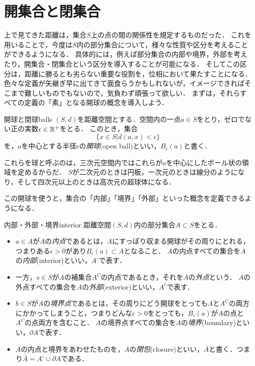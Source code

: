 \documentclass[11pt,a4paper, dvipdfmx]{jsarticle}
\begin{document}
\section{開集合と閉集合}
上で見てきた距離は，集合$S$上の点の間の関係性を規定するものだった．
これを用いることで，今度は$S$内の部分集合について，様々な性質や区分を考えることができるようになる．
具体的には，例えば部分集合の内部や境界，外部を考えたり，開集合・閉集合という区分を導入することが可能になる．
そしてこの区分は，距離に勝るとも劣らない重要な役割を，位相において果たすことになる．
色々な定義が矢継ぎ早に出てきて面食らうかもしれないが，イメージできればそこまで難しいものでもないので，気負わず頑張って欲しい．
まずは，それらすべての定義の「素」となる開球の概念を導入しよう．

\begin{dfn}{開球と閉球}{balls}
 $(S, d)$を距離空間とする．空間内の一点$a \in S$をとり，ゼロでない正の実数$\epsilon \in \mathbb{R}^+$をとる．
このとき，集合
\[
  \{ x \in S | d(a, x) < \epsilon \}
\]
を，$a$を中心とする半径$\epsilon$の\emph{開球}(open ball)といい，$B_\epsilon(a)$と書く．%
\end{dfn}
これらを球と呼ぶのは，三次元空間内ではこれらが$a$を中心にしたボール状の領域を定めるからだ．
$S$が二次元のときは円板，一次元のときは線分のようになり，そして四次元以上のときは高次元の超球体になる．

この開球を使うと，集合の「内部」「境界」「外部」といった概念を定義できるようになる．
\begin{dfn}{内部・外部・境界}{interior}
  距離空間$(S, d)$内の部分集合$A \subset S$をとる．
  \begin{itemize}
    \item $a \in A$が$A$の\emph{内点}であるとは，$A$にすっぽり収まる開球がその周りにとれる，つまりある$\epsilon > 0$があり$B_\epsilon(a) \subset A$となること．
    $A$の内点すべての集合を$A$の\emph{内部}(interior)といい，$A^\circ$で表す．
    \item 一方，$s \in S$が$A$の補集合$A^C$の内点であるとき，それを$A$の\emph{外点}という．
    $A$の外点すべての集合を$A$の\emph{外部}(exterior)といい，$A^e$で表す．
    \item $b \in S$が$A$の\emph{境界点}であるとは，その周りにどう開球をとっても$A$と$A^C$の両方にかかってしまうこと，つまりどんな$\epsilon > 0$をとっても，$B_\epsilon(a)$が$A$の点と$A^C$の点両方を含むこと．
    $A$の境界点すべての集合を$A$の\emph{境界}(boundary)といい，$\partial A$で表す．
    \item $A$の内点と境界をあわせたものを，$A$の\emph{閉包}(closure)といい，$\bar{A}$と書く．つまり$\bar{A} = A^\circ \cup \partial A$である．
  \end{itemize}
\end{dfn}
\end{document}
